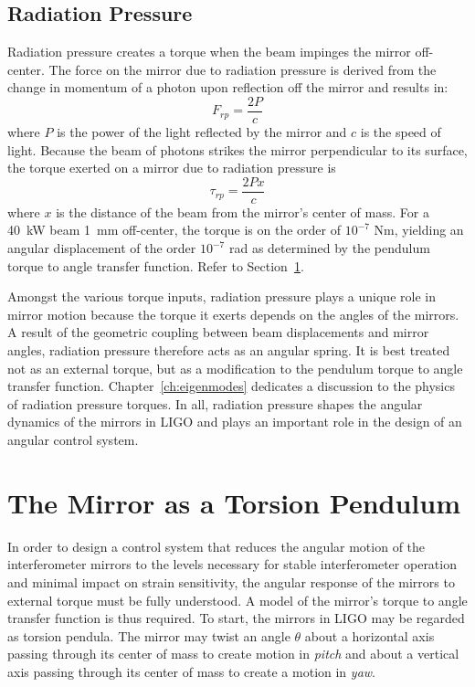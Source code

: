 \subsection{Radiation Pressure} 
\label{sec:rp_intro}
Radiation pressure creates a torque when the beam impinges the mirror
off-center. The force on the mirror due to radiation pressure is
derived from the change in momentum of a photon upon reflection off
the mirror and results in:
\begin{equation}
F_{rp} = \frac{2 P} {c}
\end{equation}
where $P$ is the power of the light reflected by the mirror and $c$ is the
speed of light. Because the beam of photons strikes the mirror
perpendicular to its surface, the torque exerted on a mirror due to
radiation pressure is
\begin{equation}
\tau_{rp} = \frac{2 P x} {c}
\label{eq:tau_rp}
\end{equation}
where $x$ is the distance of the beam from the mirror's center of mass. For a 40~kW beam 1~mm off-center, the torque is on the order of $10^{-7}$ Nm, yielding an angular displacement of the order $10^{-7}$ rad as determined by the pendulum torque to angle transfer function. Refer to Section~\ref{sec:pendTF}.

Amongst the various torque inputs, radiation pressure plays a unique role in mirror motion because the torque it exerts depends on the angles of the mirrors. A result of the geometric coupling between beam displacements and mirror angles, radiation pressure therefore acts as an angular spring. It is best treated not as an external torque, but as a modification to the pendulum torque to angle transfer function. Chapter~\ref{ch:eigenmodes} dedicates a discussion to the physics of radiation pressure torques. In all, radiation pressure shapes the angular dynamics of the mirrors in LIGO and plays an important role in the design of an angular control system.






\section{The Mirror as a Torsion Pendulum}
\label{sec:pendTF}
In order to design a control system that reduces the angular motion of the interferometer mirrors to the levels necessary for stable interferometer operation and minimal impact on strain sensitivity, the angular response of the mirrors to external torque must be fully understood. A model of the mirror's torque to angle transfer function is thus required. To start, the mirrors in LIGO may be regarded as torsion pendula. The mirror may twist an angle $\theta$ about a horizontal axis passing through its center of mass to create motion in \emph{pitch} and about a vertical axis passing through its center of mass to create a motion in \emph{yaw}.

